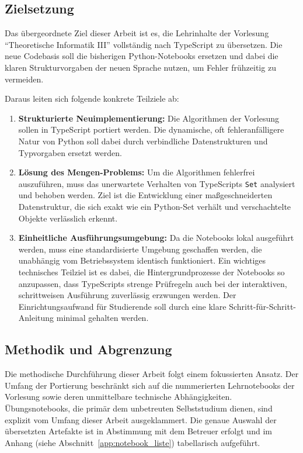 \subsection{Zielsetzung}
\label{subsec:zielsetzung}

Das übergeordnete Ziel dieser Arbeit ist es, die Lehrinhalte der Vorlesung \enquote{Theoretische Informatik III} vollständig nach TypeScript zu übersetzen. Die neue Codebasis soll die bisherigen Python-Notebooks ersetzen und dabei die klaren Strukturvorgaben der neuen Sprache nutzen, um Fehler frühzeitig zu vermeiden. 

Daraus leiten sich folgende konkrete Teilziele ab:

\begin{enumerate}
	\item \textbf{Strukturierte Neuimplementierung:} Die Algorithmen der Vorlesung sollen in TypeScript portiert werden. Die dynamische, oft fehleranfälligere Natur von Python soll dabei durch verbindliche Datenstrukturen und Typvorgaben ersetzt werden.
	
	\item \textbf{Lösung des Mengen-Problems:} Um die Algorithmen fehlerfrei auszuführen, muss das unerwartete Verhalten von TypeScripts \texttt{Set} analysiert und behoben werden. Ziel ist die Entwicklung einer maßgeschneiderten Datenstruktur, die sich exakt wie ein Python-Set verhält und verschachtelte Objekte verlässlich erkennt.
	
	\item \textbf{Einheitliche Ausführungsumgebung:} Da die Notebooks lokal ausgeführt werden, muss eine standardisierte Umgebung geschaffen werden, die unabhängig vom Betriebssystem identisch funktioniert. Ein wichtiges technisches Teilziel ist es dabei, die Hintergrundprozesse der Notebooks so anzupassen, dass TypeScripts strenge Prüfregeln auch bei der interaktiven, schrittweisen Ausführung zuverlässig erzwungen werden. Der Einrichtungsaufwand für Studierende soll durch eine klare Schritt-für-Schritt-Anleitung minimal gehalten werden.
\end{enumerate}

\subsection{Methodik und Abgrenzung}
\label{subsec:methodik}

Die methodische Durchführung dieser Arbeit folgt einem fokussierten Ansatz. Der Umfang der Portierung beschränkt sich auf die nummerierten Lehrnotebooks der Vorlesung sowie deren unmittelbare technische Abhängigkeiten. Übungsnotebooks, die primär dem unbetreuten Selbststudium dienen, sind explizit vom Umfang dieser Arbeit ausgeklammert. Die genaue Auswahl der übersetzten Artefakte ist in Abstimmung mit dem Betreuer erfolgt und im Anhang (siehe Abschnitt~\ref{app:notebook_liste}) tabellarisch aufgeführt.

